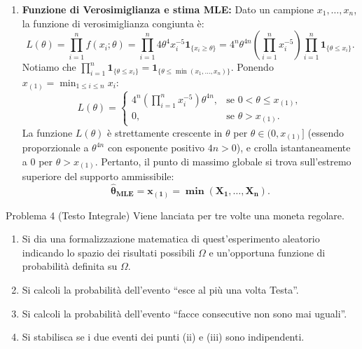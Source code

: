 \documentclass[11pt,a4paper]{article}
\begin{document}
\begin{soluzionebox}
\begin{enumerate}[label=(\roman*)]
    \item \textbf{Funzione di Verosimiglianza e stima MLE:}
    Dato un campione $x_1, \dots, x_n$, la funzione di verosimiglianza congiunta è:
    \[
    L(\theta) = \prod_{i=1}^n f(x_i; \theta) = \prod_{i=1}^n 4\theta^4 x_i^{-5} \mathbf{1}_{\{x_i \ge \theta\}} = 4^n \theta^{4n} \left( \prod_{i=1}^n x_i^{-5} \right) \prod_{i=1}^n \mathbf{1}_{\{\theta \le x_i\}}.
    \]
    Notiamo che $\prod_{i=1}^n \mathbf{1}_{\{\theta \le x_i\}} = \mathbf{1}_{\{\theta \le \min(x_1, \dots, x_n)\}}$. Ponendo $x_{(1)} = \min_{1 \le i \le n} x_i$:
    \[
    L(\theta) = \begin{cases}
    4^n \left(\prod_{i=1}^n x_i^{-5}\right) \theta^{4n}, & \text{se } 0 < \theta \le x_{(1)}, \\
    0, & \text{se } \theta > x_{(1)}.
    \end{cases}
    \]
    La funzione $L(\theta)$ è strettamente crescente in $\theta$ per $\theta \in (0, x_{(1)}]$ (essendo proporzionale a $\theta^{4n}$ con esponente positivo $4n>0$), e crolla istantaneamente a $0$ per $\theta > x_{(1)}$.
    Pertanto, il punto di massimo globale si trova sull'estremo superiore del supporto ammissibile:
    \[
    \mathbf{\widehat{\theta}_{\text{MLE}} = x_{(1)} = \min(X_1, \dots, X_n)}.
    \]
\end{enumerate}
\end{soluzionebox}

\begin{problemabox}{Problema 4 (Testo Integrale)}
Viene lanciata per tre volte una moneta regolare.
\begin{enumerate}[label=(\roman*)]
    \item Si dia una formalizzazione matematica di quest'esperimento aleatorio indicando lo spazio dei risultati possibili $\Omega$ e un'opportuna funzione di probabilità definita su $\Omega$.
    \item Si calcoli la probabilità dell'evento ``esce al più una volta Testa''.
    \item Si calcoli la probabilità dell'evento ``facce consecutive non sono mai uguali''.
    \item Si stabilisca se i due eventi dei punti (ii) e (iii) sono indipendenti.
\end{enumerate}
\end{problemabox}
\end{document}
